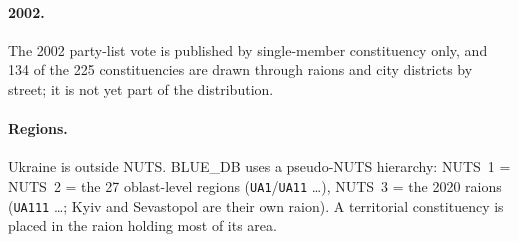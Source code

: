 \paragraph{2002.}  The 2002 party-list vote is published by single-member
constituency only, and 134 of the 225 constituencies are drawn through
raions and city districts by street; it is not yet part of the distribution.

\paragraph{Regions.}  Ukraine is outside NUTS.  BLUE\_DB uses a pseudo-NUTS
hierarchy: NUTS~1 = NUTS~2 = the 27 oblast-level regions (\texttt{UA1}/\texttt{UA11}
\ldots), NUTS~3 = the 2020 raions (\texttt{UA111} \ldots; Kyiv and Sevastopol
are their own raion).  A territorial constituency is placed in the raion
holding most of its area.
